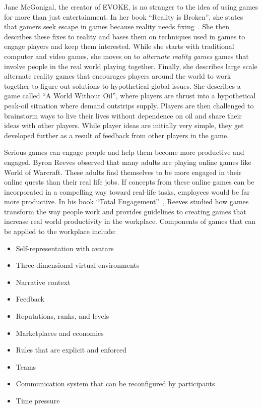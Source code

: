 Jane McGonigal, the creator of EVOKE, is no stranger to the idea of using games for more than just entertainment.  In her book ``Reality is Broken'', she states that gamers seek escape in games because reality needs fixing~\cite{mcgonigal-reality-broken}.  She then describes these fixes to reality and bases them on techniques used in games to engage players and keep them interested.  While she starts with traditional computer and video games, she moves on to \emph{alternate reality games} games that involve people in the real world playing together.  Finally, she describes large scale alternate reality games that encourages players around the world to work together to figure out solutions to hypothetical global issues.  She describes a game called ``A World Without Oil'', where players are thrust into a hypothetical peak-oil situation where demand outstrips supply.  Players are then challenged to brainstorm ways to live their lives without dependence on oil and share their ideas with other players.  While player ideas are initially very simple, they get developed further as a result of feedback from other players in the game.

Serious games can engage people and help them become more productive and engaged. Byron Reeves observed that many adults are playing online games like World of Warcraft. These adults find themselves to be more engaged in their online quests than their real life jobs. If concepts from these online games can be incorporated in a compelling way toward real-life tasks, employees would be far more productive. In his book ``Total Engagement''~\cite{reeves-total}, Reeves studied how games transform the way people work and provides guidelines to creating games that increase real world productivity in the workplace. Components of games that can be applied to the workplace include:

\begin{itemize}
  \item Self-representation with avatars
  \item Three-dimensional virtual environments
  \item Narrative context
  \item Feedback
  \item Reputations, ranks, and levels
  \item Marketplaces and economies
  \item Rules that are explicit and enforced
  \item Teams
  \item Communication system that can be reconfigured by participants
  \item Time pressure
\end{itemize}

